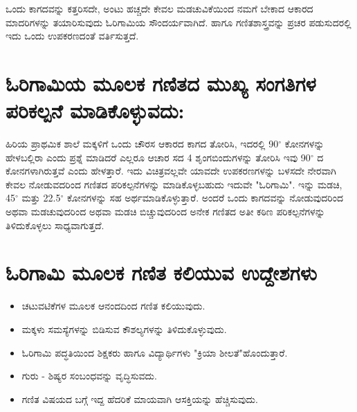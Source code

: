\medskip

ಒಂದು ಕಾಗದವನ್ನು ಕತ್ತರಿಸದೇ, ಅಂಟು ಹಚ್ಚದೇ ಕೇವಲ ಮಡಚುವಿಕೆಯಿಂದ ನಮಗೆ ಬೇಕಾದ ಆಕಾರದ ಮಾದರಿಗಳನ್ನು ತಯಾರಿಸುವುದು ಓರಿಗಾಮಿಯ ಸೌಂದರ್ಯವಾಗಿದೆ. ಹಾಗೂ ಗಣಿತಶಾಸ್ತ್ರವನ್ನು ಪ್ರಚರ ಪಡುಸುದರಲ್ಲಿ ಇದು ಒಂದು ಉಪಕರಣದಂತೆ ವರ್ತಿಸು\break ತ್ತದೆ. 

\section*{ಓರಿಗಾಮಿಯ ಮೂಲಕ ಗಣಿತದ ಮುಖ್ಯ ಸಂಗತಿಗಳ ಪರಿಕಲ್ಪನೆ ಮಾಡಿಕೊಳ್ಳುವದು:}

ಹಿರಿಯ ಪ್ರಾಥಮಿಕ ಶಾಲೆ ಮಕ್ಕಳಿಗೆ ಒಂದು ಚೌರಸ ಆಕಾರದ ಕಾಗದ ತೋರಿಸಿ, ಇದರಲ್ಲಿ 90$^{\circ}$ ಕೋನಗಳನ್ನು ಹೇಳಬಲ್ಲಿರಾ ಎಂದು ಪ್ರಶ್ನೆ ಮಾಡಿದರೆ ಎಲ್ಲರೂ ಆಚಾರ ಸದ  4 ಶೃಂಗಬಿಂದುಗಳನ್ನು ತೋರಿಸಿ ಇವು 90$^{\circ}$ ದ ಕೋನಗಳಾಗಿರುತ್ತವೆ ಎಂದು ಹೇಳತ್ತಾರೆ. ಇದು ವಿಚಿತ್ರವಲ್ಲವೇ ಯಾವದೇ ಉಪಕರಣಗಳನ್ನು ಬಳಸದೇ ನೇರವಾಗಿ ಕೇವಲ ನೋಡುವದರಿಂದ ಗಣಿತದ ಪರಿಕಲ್ಪನೆಗಳನ್ನು ಮಾಡಿಕೊಳ್ಳಬಹುದು ಇದುವೇ "ಓರಿಗಾಮಿ". ಇನ್ನು ಮಡಚಿ, 45$^{\circ}$ ಮತ್ತು 22.5$^{\circ}$ ಕೋನಗಳನ್ನು ಸಹ ಅರ್ಥಮಾಡಿಕೊಳ್ಳುತ್ತಾರೆ. ಅಂದರೆ ಒಂದು ಕಾಗದವನ್ನು ನೋಡುವುದರಿಂದ ಅಥವಾ ಮಡಚುವುದರಿಂದ ಅಥವಾ ಮಡಚಿ ಬಿಚ್ಚುವುದರಿಂದ ಅನೇಕ ಗಣಿತದ ಅತೀ ಕಠಿಣ ಪರಿಕಲ್ಪನೆಗಳನ್ನು ತಿಳಿದುಕೊಳ್ಳಲು ಸಾಧ್ಯವಾಗುತ್ತದೆ. 

\section*{ಓರಿಗಾಮಿ ಮೂಲಕ ಗಣಿತ ಕಲಿಯುವ ಉದ್ದೇಶಗಳು}
\begin{itemize}
\item ಚಟುವಟಿಕೆಗಳ ಮೂಲಕ ಆನಂದದಿಂದ ಗಣಿತ ಕಲಿಯುವುದು.
\item ಮಕ್ಕಳು ಸಮಸ್ಯೆಗಳನ್ನು ಬಿಡಿಸುವ ಕೌಶಲ್ಯಗಳನ್ನು ತಿಳಿದುಕೊಳ್ಳುವುದು. 
\item ಓರಿಗಾಮಿ ಪದ್ಧತಿಯಿಂದ ಶಿಕ್ಷಕರು ಹಾಗೂ ವಿದ್ಯಾರ್ಥಿಗಳು "ಕ್ರಿಯಾ ಶೀಲತೆ"\break ಹೊಂದುತ್ತಾರೆ.
\item ಗುರು - ಶಿಷ್ಯರ ಸಂಬಂಧವನ್ನು ವೃದ್ಧಿಸುವದು. 
\item  ಗಣಿತ  ವಿಷಯದ ಬಗ್ಗೆ ಇದ್ದ ಹೆದರಿಕೆ ಮಾಯವಾಗಿ ಆಸಕ್ತಿಯನ್ನು ಹೆಚ್ಚಿಸುವುದು. 
\end{itemize}

